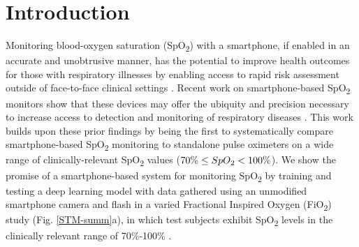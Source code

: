 \documentclass[12pt]{article}
\begin{document}
\newpage
\section*{Introduction}

Monitoring blood-oxygen saturation (SpO\textsubscript{2}) with a smartphone, if enabled in an accurate and unobtrusive manner, has the potential to improve health outcomes for those with respiratory illnesses by enabling access to rapid risk assessment outside of face-to-face clinical settings \cite{steinhubl2015emerging}. Recent work on smartphone-based SpO\textsubscript{2} monitors show that these devices may offer the ubiquity and precision necessary to increase access to detection and monitoring of respiratory diseases \cite{bui2020smartphone,ding2018measuring}. This work builds upon these prior findings by being the first to systematically compare smartphone-based SpO\textsubscript{2} monitoring to standalone pulse oximeters on a wide range of clinically-relevant SpO\textsubscript{2} values ($70\% \leq SpO\textsubscript{2} < 100\%$). We show the promise of a smartphone-based system for monitoring SpO\textsubscript{2} by training and testing a deep learning model with data gathered using an unmodified smartphone camera and flash in a varied Fractional Inspired Oxygen (FiO\textsubscript{2}) study (Fig. \ref{STM-summ}a), in which test subjects exhibit SpO\textsubscript{2} levels in the clinically relevant range of 70\%-100\% \cite{us2013pulse}.
\end{document}
